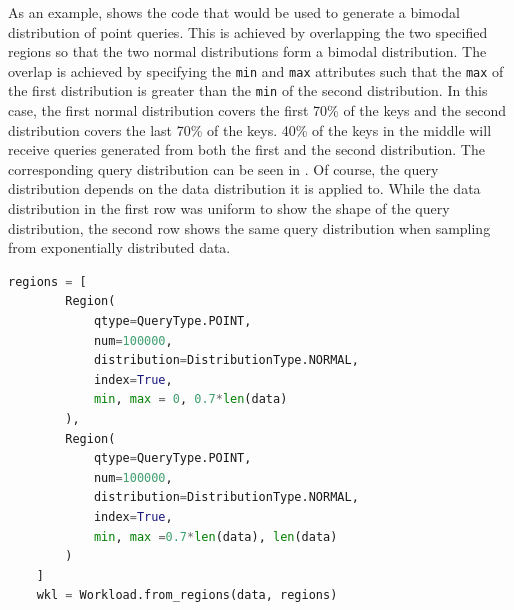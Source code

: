 As an example,  shows the code that would be used to generate a bimodal distribution of point queries. This is achieved by overlapping the two specified regions so that the two normal distributions form a bimodal distribution. The overlap is achieved by specifying the \verb|min| and \verb|max| attributes such that the \verb|max| of the first distribution is greater than the \verb|min| of the second distribution. In this case, the first normal distribution covers the first 70\% of the keys and the second distribution covers the last 70\% of the keys. 40\% of the keys in the middle will receive queries generated from both the first and the second distribution. The corresponding query distribution can be seen in . Of course, the query distribution  depends on the data distribution it is applied to. While the data distribution in the first row was uniform to show the shape of the query distribution, the second row shows the same query distribution when sampling from exponentially distributed data.

\begin{lstlisting}[language=Python, caption=Example workload generation from Region objects, label=lst:generation]
    regions = [
        Region(
            qtype=QueryType.POINT, 
            num=100000, 
            distribution=DistributionType.NORMAL, 
            index=True, 
            min, max = 0, 0.7*len(data)
        ),
        Region(
            qtype=QueryType.POINT, 
            num=100000, 
            distribution=DistributionType.NORMAL, 
            index=True, 
            min, max =0.7*len(data), len(data)
        )
    ]
    wkl = Workload.from_regions(data, regions)
\end{lstlisting}

